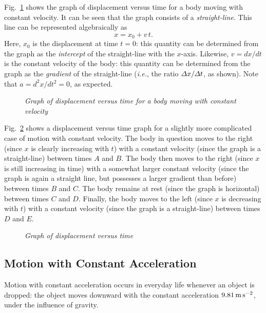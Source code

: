 Fig.~\ref{f6} shows the graph of displacement versus time for a body
moving with constant velocity. It can be seen that the graph consists of
a {\em straight-line}. This line can be represented algebraically as
\begin{equation}
x = x_0 + v\,t.
\end{equation}
Here, $x_0$ is the displacement at time $t=0$: this quantity can be  determined from the
graph as the {\em intercept} of the
straight-line with the $x$-axis. Likewise, $v=dx/dt$ is the constant velocity of
the body: this quantity can be determined from the graph as the {\em gradient} of the straight-line
({\em i.e.}, the ratio ${\mit\Delta}x/{\mit\Delta} t$, as shown). Note that
$a=d^2 x/dt^2=0$, as expected.

\begin{figure}
\epsfysize=3in
\centerline{}
\caption{\em Graph of displacement versus time for a body moving with constant velocity}\label{f6}   
\end{figure}

Fig.~\ref{f7} shows a  displacement versus time graph for a slightly  more
complicated case of motion with constant velocity. The body in question moves
to the right (since $x$ is clearly increasing with $t$) with a constant velocity (since
the graph is a straight-line) between times $A$ and $B$. The body then moves to
the right (since $x$ is still increasing in time) with a somewhat larger constant velocity
(since the graph is again a straight line, but possesses a larger gradient than before) between times
$B$ and $C$. The body remains at rest (since the graph is horizontal) between times $C$ and $D$.
Finally, the body moves to the left (since $x$ is decreasing with $t$) with a constant
velocity (since
the graph is a straight-line) between times $D$ and $E$.

\begin{figure}
\epsfysize=3in
\centerline{}
\caption{\em Graph of displacement versus time}\label{f7}   
\end{figure}

\subsection{Motion with Constant Acceleration}\label{caccn}
Motion with constant acceleration occurs in everyday life whenever an
object is dropped: the object moves downward with the constant
acceleration $9.81\,{\rm m\,s^{-2}}$, under the influence of gravity.

